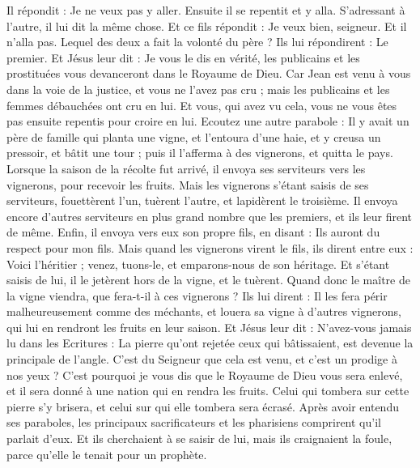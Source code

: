 \begin{multicols}{2}
Il répondit : Je ne veux pas y aller. Ensuite il se repentit et y alla.
S’adressant à l’autre, il lui dit la même chose. Et ce fils répondit : Je veux bien, seigneur. Et il n’alla pas.
Lequel des deux a fait la volonté du père ? Ils lui répondirent : Le premier. Et Jésus leur dit : Je vous le dis en vérité, les publicains et les prostituées vous devanceront dans le Royaume de Dieu.
Car Jean est venu à vous dans la voie de la justice, et vous ne l'avez pas cru ; mais les publicains et les femmes débauchées ont cru en lui. Et vous, qui avez vu cela, vous ne vous êtes pas ensuite repentis pour croire en lui.
Ecoutez une autre parabole : Il y avait un père de famille qui planta une vigne, et l’entoura d'une haie, et y creusa un pressoir, et bâtit une tour ; puis il l’afferma à des vignerons, et quitta le pays.
Lorsque la saison de la récolte fut arrivé, il envoya ses serviteurs vers les vignerons, pour recevoir les fruits.
Mais les vignerons s’étant saisis de ses serviteurs, fouettèrent l'un, tuèrent l'autre, et lapidèrent le troisième.
Il envoya encore d'autres serviteurs en plus grand nombre que les premiers, et ils leur firent de même.
Enfin, il envoya vers eux son propre fils, en disant : Ils auront du respect pour mon fils.
Mais quand les vignerons virent le fils, ils dirent entre eux : Voici l'héritier ; venez, tuons-le, et emparons-nous de son héritage.
Et s’étant saisis de lui, il le jetèrent hors de la vigne, et le tuèrent.
Quand donc le maître de la vigne viendra, que fera-t-il à ces vignerons ?
Ils lui dirent : Il les fera périr malheureusement comme des méchants, et louera sa vigne à d’autres vignerons, qui lui en rendront les fruits en leur saison.
Et Jésus leur dit : N'avez-vous jamais lu dans les Ecritures : La pierre qu’ont rejetée ceux qui bâtissaient, est devenue la principale de l’angle. C’est du Seigneur que cela est venu, et c’est un prodige à nos yeux ?
C'est pourquoi je vous dis que le Royaume de Dieu vous sera enlevé, et il sera donné à une nation qui en rendra les fruits.
Celui qui tombera sur cette pierre s’y brisera, et celui sur qui elle tombera sera écrasé.
Après avoir entendu ses paraboles, les principaux sacrificateurs et les pharisiens comprirent qu'il parlait d'eux.
Et ils cherchaient à se saisir de lui, mais ils craignaient la foule, parce qu’elle le tenait pour un prophète.

\end{multicols}
